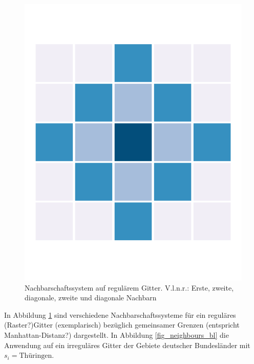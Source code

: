 \begin{figure}
\begin{minipage}[b]{.22\linewidth}
       \includegraphics[width=\linewidth,trim={0.7cm 2.2cm 0.7cm 2.2cm},clip]{body/figures/64-nb_zd.pdf}
    \end{minipage}
    \caption[Nachbarschaftssysteme]{Nachbarschaftssystem auf regulärem Gitter. V.l.n.r.: Erste, zweite, 
    diagonale, zweite und diagonale Nachbarn}
    \label{fig_neighbours}
 \end{figure}


In Abbildung \ref{fig_neighbours} sind verschiedene Nachbarschaftssysteme für ein reguläres 
(Raster?)Gitter (exemplarisch) bezüglich 
gemeinsamer Grenzen (entspricht Manhattan-Distanz?) dargestellt. In Abbildung \ref{fig_neighbours_bl} die Anwendung auf ein 
irreguläres Gitter der Gebiete deutscher Bundesländer mit $s_i=\text{Thüringen}$.

